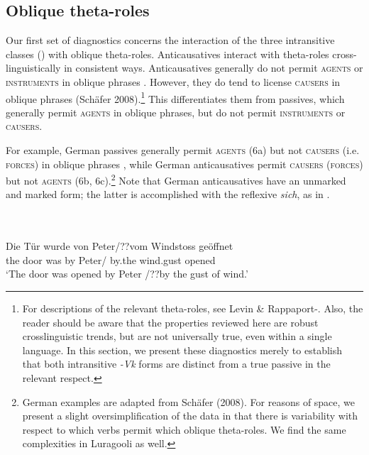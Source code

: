 \documentclass[output=paper]{langsci/langscibook}
\begin{document}
\subsection{Oblique theta-roles} %

Our first set of diagnostics concerns the interaction of the three intransitive classes () with oblique theta-roles. Anticausatives interact with theta-roles cross-linguistically in consistent ways. Anticausatives generally do not permit \textsc{agents }or \textsc{instruments }in oblique phrases \citep{LevinRappaportHovav1995}. However, they do tend to license \textsc{causers} in oblique phrases (Schäfer 2008).\footnote{ For descriptions of the relevant theta-roles, see Levin \& Rappaport-\citet{Hovav1995}. Also, the reader should be aware that the properties reviewed here are robust crosslinguistic trends, but are not universally true, even within a single language. In this section, we present these diagnostics merely to establish that both intransitive \textit{-Vk} forms are distinct from a true passive in the relevant respect.} This differentiates them from passives, which generally permit \textsc{agents} in oblique phrases, but do not permit \textsc{instruments }or \textsc{causers}.

For example, German passives generally permit \textsc{agents (6}a) but not \textsc{causers (}i.e. \textsc{forces}) in oblique phrases\textsc{ }, while German anticausatives permit \textsc{causers} (\textsc{forces}) but not \textsc{agents }(6b, 6c).\footnote{{ }German examples are adapted from Schäfer (2008). For reasons of space, we present a slight oversimplification of the data in that there is variability with respect to which verbs permit which oblique theta-roles. We find the same complexities in Luragooli as well.}\textsuperscript{  }Note that German anticausatives have an unmarked and marked form; the latter is accomplished with the reflexive \textit{sich}, as in .

\ea\label{exx:}
{}\\
\ea\label{ex:}
\\
\gll   Die Tür wurde von Peter/??vom      Windstoss  geöffnet\\
       the door was    by   Peter/     by.the  wind.gust   opened\\
\glt ‘The door was opened by Peter /??by the gust of wind.’
\end{document}
